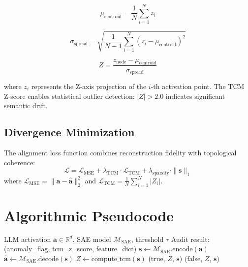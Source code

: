 \documentclass[11pt]{article}
\begin{document}
\begin{equation}
    \mu_{\text{centroid}} = \frac{1}{N} \sum_{i=1}^N z_i
\end{equation}

\begin{equation}
    \sigma_{\text{spread}} = \sqrt{\frac{1}{N-1} \sum_{i=1}^N (z_i - \mu_{\text{centroid}})^2}
\end{equation}

\begin{equation}
    Z = \frac{z_{\text{node}} - \mu_{\text{centroid}}}{\sigma_{\text{spread}}}
\end{equation}

where $z_i$ represents the Z-axis projection of the $i$-th activation point. The TCM Z-score enables statistical outlier detection: $|Z| > 2.0$ indicates significant semantic drift.

\subsection{Divergence Minimization}

The alignment loss function combines reconstruction fidelity with topological coherence:
\begin{equation}
    \mathcal{L} = \mathcal{L}_{\text{MSE}} + \lambda_{\text{TCM}} \cdot \mathcal{L}_{\text{TCM}} + \lambda_{\text{sparsity}} \cdot \|\mathbf{s}\|_1
\end{equation}
where $\mathcal{L}_{\text{MSE}} = \|\mathbf{a} - \hat{\mathbf{a}}\|_2^2$ and $\mathcal{L}_{\text{TCM}} = \frac{1}{N} \sum_{i=1}^N |Z_i|$.

\section{Algorithmic Pseudocode}

\begin{algorithm}[t]
\caption{SAE Audit Pipeline}
\label{alg:sae_audit}
\begin{algorithmic}[1]
\REQUIRE LLM activation $\mathbf{a} \in \mathbb{R}^d$, SAE model $\mathcal{M}_{\text{SAE}}$, threshold $\tau$
\ENSURE Audit result: (anomaly\_flag, tcm\_z\_score, feature\_dict)
\STATE $\mathbf{s} \leftarrow \mathcal{M}_{\text{SAE}}.\text{encode}(\mathbf{a})$ 
\STATE $\hat{\mathbf{a}} \leftarrow \mathcal{M}_{\text{SAE}}.\text{decode}(\mathbf{s})$ 
\STATE $Z \leftarrow \text{compute\_tcm}(\mathbf{s})$ 
    \STATE \RETURN (true, $Z$, $\mathbf{s}$)
\ELSE
    \STATE \RETURN (false, $Z$, $\mathbf{s}$)
\ENDIF
\end{algorithmic}
\end{algorithm}
\end{document}
